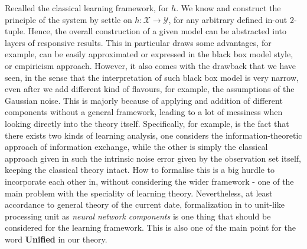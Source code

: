 Recalled the classical learning framework, for $h$. We know and construct the principle of the system by settle on $h:\mathcal{X}\to \mathcal{Y}$, for any arbitrary defined in-out 2-tuple. Hence, the overall construction of a given model can be abstracted into layers of responsive results. This in particular draws some advantages, for example, can be easily approximated or expressed in the black box model style, or empiricism approach. However, it also comes with the drawback that we have seen, in the sense that the interpretation of such black box model is very narrow, even after we add different kind of flavours, for example, the assumptions of the Gaussian noise. This is majorly because of applying and addition of different components without a general framework, leading to a lot of messiness when looking directly into the theory itself. Specifically, for example, is the fact that there exists two kinds of learning analysis, one considers the information-theoretic approach of information exchange, while the other is simply the classical approach given in such the intrinsic noise error given by the observation set itself, keeping the classical theory intact. How to formalise this is a big hurdle to incorporate each other in, without considering the wider framework - one of the main problem with the speciality of learning theory. Nevertheless, at least accordance to general theory of the current date, formalization in to unit-like processing unit as \textit{neural network components} is one thing that should be considered for the learning framework. This is also one of the main point for the word \textbf{Unified} in our theory. 


%
%

